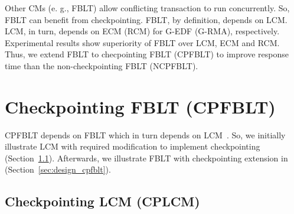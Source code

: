 \documentclass[preprint]{sigplanconf}
\begin{document}
Other CMs (e. g., FBLT\cite{fblt}) allow conflicting transaction to run concurrently. So, FBLT can benefit from checkpointing. FBLT, by definition, depends on LCM. LCM, in turn, depends
on ECM (RCM) for G-EDF (G-RMA), respectively. Experimental results
show superiority of FBLT over LCM, ECM and RCM\cite{fblt}. Thus, we extend FBLT to checpointing FBLT (CPFBLT) to improve response time than the non-checkpointing FBLT (NCPFBLT).

\section{Checkpointing FBLT (CPFBLT)}\label{sec:cpfblt_design}

CPFBLT depends on FBLT which in turn depends on LCM~\cite{lcmdac2012}. So, we initially illustrate LCM with required modification to implement checkpointing (Section~\ref{sec:cplcm}). Afterwards, we illustrate FBLT with checkpointing extension in (Section~\ref{sec:design_cpfblt}).

\subsection{Checkpointing LCM (CPLCM)}\label{sec:cplcm}
\end{document}
